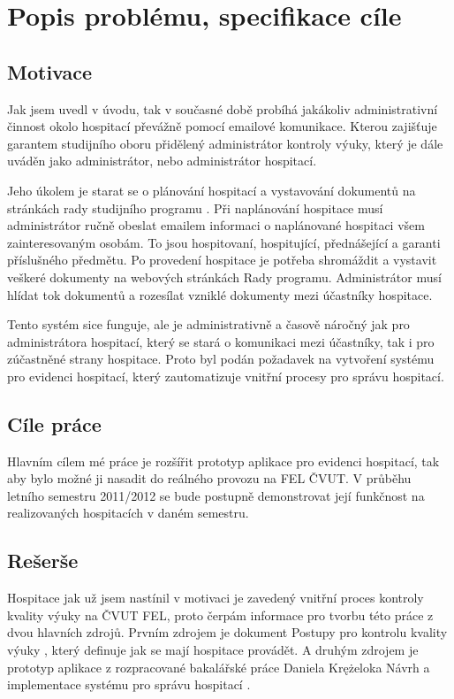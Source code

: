 \chapter{Popis problému, specifikace cíle}
\section{Motivace}
Jak jsem uvedl v úvodu, tak v současné době probíhá jakákoliv administrativní činnost okolo hospitací převážně pomocí emailové komunikace. Kterou zajišťuje garantem studijního oboru přidělený administrátor kontroly výuky, který je dále  uváděn jako administrátor, nebo administrátor hospitací. 

Jeho úkolem je starat se o plánování hospitací a vystavování dokumentů na stránkách rady studijního programu \cite{kvalitavyukyweb}. Při naplánování hospitace musí administrátor ručně obeslat emailem informaci o naplánované hospitaci všem zainteresovaným osobám. To jsou hospitovaní, hospitující, přednášející a garanti příslušného předmětu. Po provedení hospitace je potřeba shromáždit a vystavit veškeré dokumenty na webových stránkách Rady programu. Administrátor musí hlídat tok dokumentů a rozesílat vzniklé dokumenty mezi účastníky hospitace.

Tento systém sice funguje, ale je administrativně a časově náročný jak pro administrátora hospitací, který se stará o komunikaci mezi účastníky, tak i pro zúčastněné strany hospitace. Proto byl podán požadavek na vytvoření systému pro evidenci hospitací, který zautomatizuje vnitřní procesy pro správu hospitací.

\section{Cíle práce}
Hlavním cílem mé práce je rozšířit prototyp aplikace pro evidenci hospitací, tak aby bylo možné ji nasadit do reálného provozu na FEL ČVUT. V průběhu letního semestru 2011/2012 se bude postupně demonstrovat její funkčnost na realizovaných hospitacích v daném semestru.

\section{Rešerše}
Hospitace jak už jsem nastínil v motivaci je zavedený vnitřní proces kontroly kvality výuky na ČVUT FEL, proto čerpám informace pro tvorbu této práce z dvou hlavních zdrojů. Prvním zdrojem je dokument Postupy pro kontrolu kvality výuky \cite{postupy}, který definuje jak se mají hospitace provádět. A druhým zdrojem je prototyp aplikace z rozpracované bakalářské práce Daniela Krężeloka Návrh a implementace systému pro správu hospitací \cite{prototyp_documentace}.

